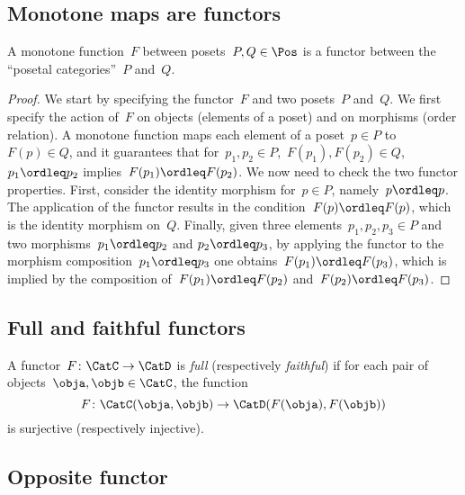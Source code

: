 
\subsection{Monotone maps are functors}
\begin{lemma}
\label{lemma:posetfunctor}
A monotone function~$F$ between posets~$P,Q \in \Pos$ is a functor between the ``posetal categories''~$P$ and~$Q$.
\end{lemma}
\begin{proof}
We start by specifying the functor~$F$ and two posets~$P$ and~$Q$. We first specify the action of~$F$ on objects (elements of a poset) and on morphisms (order relation). A monotone function maps each element of a poset~$p\in P$ to~$F(p) \in Q$, and it guarantees that for~$p_1,p_2\in P$,~$F(p_1),F(p_2)\in Q$,~$p_1\ordleq p_2$ implies~$F(p_1)\ordleq F(p_2)$. We now need to check the two functor properties. First, consider the identity morphism for~$p\in P$, namely~$p\ordleq p$. The application of the functor results in the condition~$F(p)\ordleq F(p)$, which is the identity morphism on~$Q$. Finally, given three elements~$p_1,p_2,p_3\in P$ and two morphisms~$p_1\ordleq p_2$ and $p_2\ordleq p_3$, by applying the functor to the morphism composition~$p_1\ordleq p_3$ one obtains~$F(p_1)\ordleq F(p_3)$, which is implied by the composition of~$F(p_1)\ordleq F(p_2)$ and~$F(p_2)\ordleq F(p_3)$.
\end{proof}

\subsection{Full and faithful functors}
\begin{ctdefinition}
\label{def:functorfullfaith}
A functor~$F\colon \CatC \to \CatD$ is \emph{full} (respectively \emph{faithful}) if for each pair of objects~$\obja,\objb\in \CatC$, the function
\begin{equation}
    F\colon \CatC(\obja,\objb)\to \CatD(F(\obja),F(\objb))
\end{equation}
is surjective (respectively injective).
\end{ctdefinition} 
\subsection{Opposite functor}

